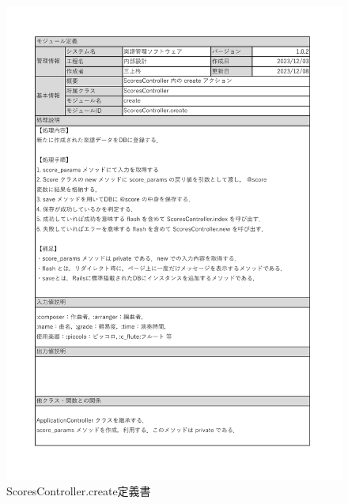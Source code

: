 \begin{figure}[h]
    \includegraphics[scale=0.7]{img/Scores/xlsx/ScoresController_create.pdf}
    \caption{ScoresController.create定義書}
\end{figure}
